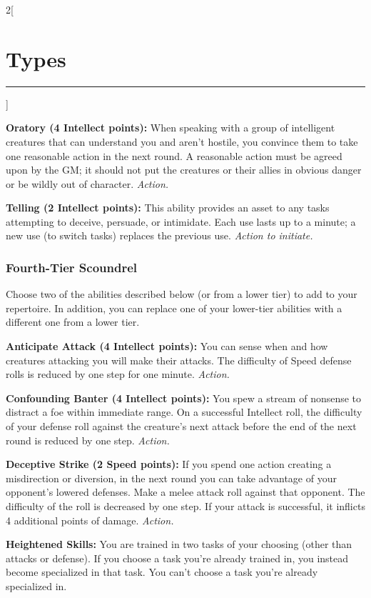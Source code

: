 \documentclass[a4paper,10pt,final]{book}
\newcommand{\HRule}{\rule{\linewidth}{0.5mm}} %
\newcommand{\newSection}[1]{\section*{#1} \addcontentsline{toc}{section}{#1} \label{sec:#1} \HRule}
\newcommand{\itemAbility}[2]{\textcolor{25gray}{\textbullet\textbf{ #1:}} {#2}\par}
\newcommand{\action}{\textit{ Action.}}
\newcommand{\actionInit}{\textit{ Action to initiate.}}
\newenvironment{docsection}[1]
{
  \begin{multicols*}{2}[\newSection{#1}]
}
{
  \end{multicols*}
  \newpage
}
\begin{document}
\begin{docsection}{Types}
\itemAbility{Oratory (4 Intellect points)}{When
speaking with a group of intelligent
creatures that can understand you and
aren’t hostile, you convince them to take
one reasonable action in the next round. A reasonable action must be agreed upon by
the GM; it should not put the creatures or
their allies in obvious danger or be wildly
out of character.\action}

\itemAbility{Telling (2 Intellect points)}{This ability
provides an asset to any tasks attempting to
deceive, persuade, or intimidate. Each use
lasts up to a minute; a new use (to switch
tasks) replaces the previous use.\actionInit}


\subsubsection*{Fourth-Tier Scoundrel}
\label{subsub:scoundrelFourthTier}

Choose two of the abilities described
below (or from a lower tier) to add to your
repertoire. In addition, you can replace one
of your lower-tier abilities with a different
one from a lower tier.\par 

\itemAbility{Anticipate Attack (4 Intellect points)}{You can sense when and how creatures
attacking you will make their attacks. The
difficulty of Speed defense rolls is reduced
by one step for one minute.\action}

\itemAbility{Confounding Banter (4 Intellect points)}{You spew a stream of nonsense to distract
a foe within immediate range. On a
successful Intellect roll, the difficulty of
your defense roll against the creature’s next
attack before the end of the next round is
reduced by one step.\action}

\itemAbility{Deceptive Strike (2 Speed points)}{If you spend one action creating a misdirection or diversion, in the next round you can take advantage of your opponent’s lowered defenses. Make a melee attack roll against that opponent. The difficulty of the roll is decreased by one step. If your attack is successful, it inflicts 4 additional points of damage.\action}

\itemAbility{Heightened Skills}{You are trained in two
tasks of your choosing (other than attacks
or defense). If you choose a task you’re
already trained in, you instead become
specialized in that task. You can’t choose a
task you’re already specialized in.}


\end{docsection}
\end{document}
